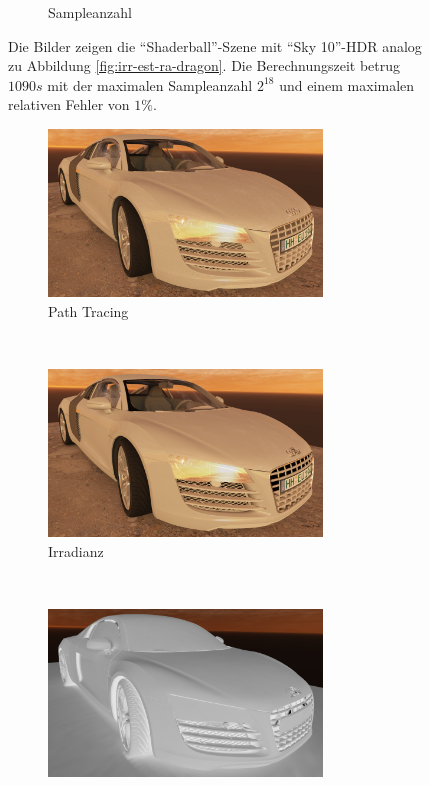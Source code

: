 \begin{figure}[h]
\begin{subfigure}[t]{\textwidth}
			\caption{Sampleanzahl}
		\end{subfigure}
		\caption[Vertex Lighting anhand der \enquote{Shaderball}-Szene mit \enquote{Sky 10}-HDR]{Die Bilder zeigen die \enquote{Shaderball}-Szene mit \enquote{Sky 10}-HDR analog zu Abbildung \ref{fig:irr-est-ra-dragon}. Die Berechnungszeit betrug $1090\unit{s}$ mit der maximalen Sampleanzahl $2^{18}$ und einem maximalen relativen Fehler von $1\unit{\%}$.}
		\label{fig:irr-est-ra-shaderball3}
	\end{figure}

	\begin{figure}[h]
		\begin{subfigure}[t]{\textwidth}
			\center
			\includegraphics[width=0.8\textwidth]{pic/irr_est-ra-r8-ref.png}
			\caption{Path Tracing}
		\end{subfigure}
		\medskip \\
		\begin{subfigure}[t]{\textwidth}
			\center
			\includegraphics[width=0.8\textwidth]{pic/irr_est-ra-r8-irr.png}
			\caption{Irradianz}
		\end{subfigure}
		\medskip \\
		\begin{subfigure}[t]{\textwidth}
			\center
			\includegraphics[width=0.8\textwidth]{pic/irr_est-ra-r8-scount.png}

\end{subfigure}
\end{figure}
